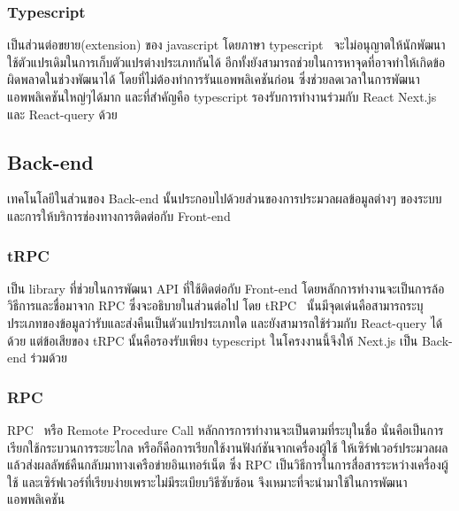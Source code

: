 \subsubsection{Typescript}
เป็นส่วนต่อขยาย(extension) ของ javascript โดยภาษา typescript~\cite{typescript} จะไม่อนุญาตให้นักพัฒนาใช้ตัวแปรเดิมในการเก็บตัวแปรต่างประเภทกันได้
อีกทั้งยังสามารถช่วยในการหาจุดที่อาจทำให้เกิดข้อผิดพลาดในช่วงพัฒนาได้ โดยที่ไม่ต้องทำการรันแอพพลิเคชันก่อน ซึ่งช่วยลดเวลาในการพัฒนาแอพพลิเคชันใหญ่ๆได้มาก
และที่สำคัญคือ typescript รองรับการทำงานร่วมกับ React Next.js และ React-query ด้วย
\subsection{Back-end}
เทคโนโลยีในส่วนของ Back-end นั้นประกอบไปด้วยส่วนของการประมวลผลข้อมูลต่างๆ ของระบบ และการให้บริการช่องทางการติดต่อกับ Front-end
\subsubsection{tRPC}
เป็น library ที่ช่วยในการพัฒนา API ที่ใช้ติดต่อกับ Front-end โดยหลักการทำงานจะเป็นการล้อวิธีการและชื่อมาจาก RPC ซึ่งจะอธิบายในส่วนต่อไป
โดย tRPC~\cite{trpcIntroducingTRPC} นั้นมีจุดเด่นคือสามารถระบุประเภทของข้อมูลว่ารับและส่งคืนเป็นตัวแปรประเภทใด และยังสามารถใช้ร่วมกับ React-query ได้ด้วย แต่ข้อเสียของ tRPC นั้นคือรองรับเพียง typescript
ในโครงงานนี้จึงให้ Next.js เป็น Back-end ร่วมด้วย
\subsubsection{RPC}
RPC~\cite{RPC-wiki} หรือ Remote Procedure Call หลักการการทำงานจะเป็นตามที่ระบุในชื่อ นั่นคือเป็นการเรียกใช้กระบวนการระยะไกล หรือก็คือการเรียกใช้งานฟังก์ชันจากเครื่องผู้ใช้ 
ให้เซิร์ฟเวอร์ประมวลผลแล้วส่งผลลัพธ์คืนกลับมาทางเครือข่ายอินเทอร์เน็ต ซึ่ง RPC เป็นวิธีการในการสื่อสารระหว่างเครื่องผู้ใช้ และเซิร์ฟเวอร์ที่เรียบง่ายเพราะไม่มีระเบียบวิธีซับซ้อน
จึงเหมาะที่จะนำมาใช้ในการพัฒนาแอพพลิเคชัน
